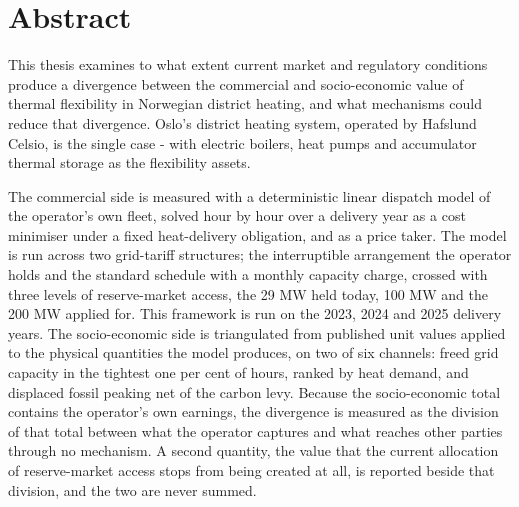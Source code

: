 \section*{Abstract}

This thesis examines to what extent current market and regulatory conditions produce a divergence between the commercial and socio-economic value of thermal flexibility in Norwegian district heating, and what mechanisms could reduce that divergence. Oslo's district heating system, operated by Hafslund Celsio, is the single case - with electric boilers, heat pumps and accumulator thermal storage as the flexibility assets.

The commercial side is measured with a deterministic linear dispatch model of the operator's own fleet, solved hour by hour over a delivery year as a cost minimiser under a fixed heat-delivery obligation, and as a price taker. The model is run across two grid-tariff structures; the interruptible arrangement the operator holds and the standard schedule with a monthly capacity charge, crossed with three levels of reserve-market access, the 29 MW held today, 100 MW and the 200 MW applied for. This framework is run on the 2023, 2024 and 2025 delivery years. The socio-economic side is triangulated from published unit values applied to the physical quantities the model produces, on two of six channels: freed grid capacity in the tightest one per cent of hours, ranked by heat demand, and displaced fossil peaking net of the carbon levy. Because the socio-economic total contains the operator's own earnings, the divergence is measured as the division of that total between what the operator captures and what reaches other parties through no mechanism. A second quantity, the value that the current allocation of reserve-market access stops from being created at all, is reported beside that division, and the two are never summed.

